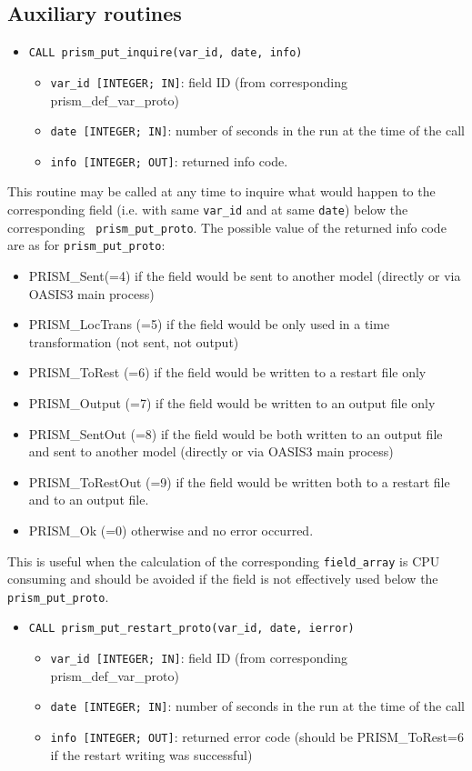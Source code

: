 \subsection{Auxiliary routines}
\label{subsec:auxiliary}
\begin{itemize} 
\item {\tt CALL prism\_put\_inquire(var\_id, date, info)}
\begin{itemize}
\item {\tt var\_id [INTEGER; IN]}: field ID (from
  corresponding prism\_def\_var\_proto)
\item {\tt date [INTEGER; IN]}: number of seconds in the run at the
time of the call
\item {\tt info [INTEGER; OUT]}: returned info code. 
\end{itemize}
\end{itemize}

This routine may be called at any time to
inquire what would happen to the corresponding field (i.e. with same
{\tt var\_id} and at same {\tt date}) below the corresponding {\tt
  prism\_put\_proto}. The possible value of the returned info code are
as for {\tt prism\_put\_proto}:   
\begin{itemize}
      \item PRISM\_Sent(=4) if the field would be sent to another model 
      (directly or via OASIS3 main process)
      \item PRISM\_LocTrans (=5) if the field would be only used in a time
       transformation (not sent, not output)
      \item PRISM\_ToRest (=6) if the field would be written to a restart file only
      \item PRISM\_Output (=7) if the field would be written to an output file only
      \item PRISM\_SentOut (=8) if the field would be both written to an output file
       and sent to another model (directly or via OASIS3 main process)
      \item PRISM\_ToRestOut (=9) if the field would be written both to a
       restart file and to an output file.
      \item PRISM\_Ok (=0) otherwise and no error occurred. 
\end{itemize}
This is useful when the
calculation of the corresponding {\tt field\_array} is CPU consuming
and should be avoided if the field is not effectively used below the {\tt
prism\_put\_proto}.

\begin{itemize} 
\item {\tt CALL prism\_put\_restart\_proto(var\_id, date, ierror)}
\begin{itemize}
\item {\tt var\_id [INTEGER; IN]}: field ID (from
  corresponding prism\_def\_var\_proto)
\item {\tt date [INTEGER; IN]}: number of seconds in the run at the
time of the call
\item {\tt info [INTEGER; OUT]}: returned error code (should be
  PRISM\_ToRest=6 if the restart writing was successful)
\end{itemize}
\end{itemize}

